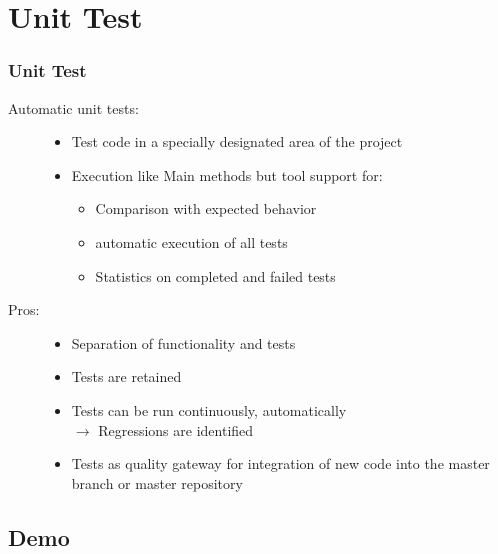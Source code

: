 
\section{Unit Test}


\begin{frame}
 \frametitle{Unit Test}
  \scriptsize
 \begin{description}
 \item [Automatic unit tests:] \hfill
  \begin{itemize}
  \item Test code in a specially designated area of the project
  \item Execution like \alert{Main methods} but tool support for:
  \begin{itemize}
    \item Comparison with expected behavior
    \item automatic execution of all tests
    \item Statistics on completed and failed tests
   \end{itemize}
\end{itemize}
\end{description}
 \pause
 
 \begin{description}
 \item [Pros:] \hfill
\begin{itemize}
   \item Separation of functionality and tests
   \item Tests are retained
   \item Tests can be run continuously, automatically\\
      $\rightarrow$ Regressions are identified
   \item Tests as \alert{quality gateway} for integration of new code into the master branch or master repository
\end{itemize}
\end{description}
\end{frame}


\subsection{Demo}


